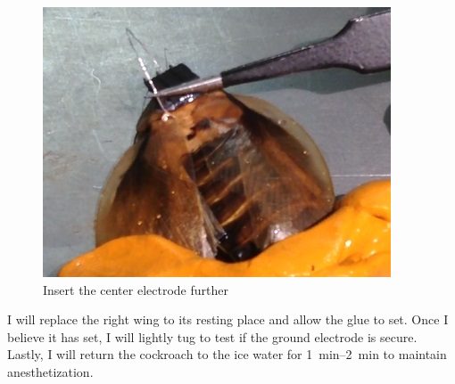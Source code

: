 {\begin{figure}[ht!]
\centering
\includegraphics[scale=0.5]{Surgery Photos/celectrode2.jpg}
\caption{Insert the center electrode further}
\label{fig:celectrode2}
\end{figure}}
I will replace the right wing to its resting place and allow the glue to set. Once I believe it has set, I will lightly tug to test if the ground electrode is secure. Lastly, I will return the cockroach to the ice water for \SIrange{1}{2}{\minute} to maintain anesthetization.

